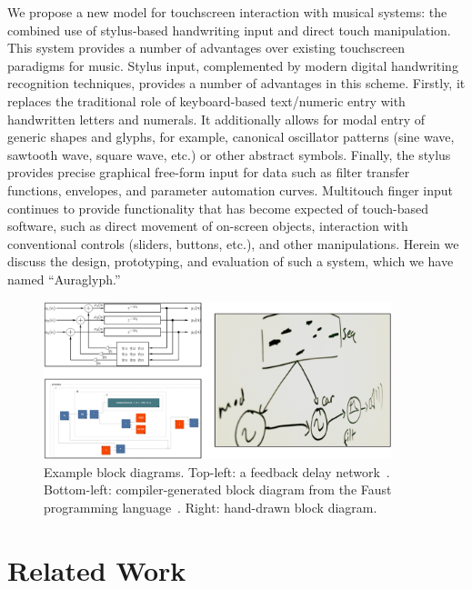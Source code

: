 \documentclass{nime-alternate}
\begin{document}
We propose a new model for touchscreen interaction with musical systems: the combined use of stylus-based handwriting input and direct touch manipulation. 
This system provides a number of advantages over existing touchscreen paradigms for music. 
Stylus input, complemented by modern digital handwriting recognition techniques, provides a number of advantages in this scheme. 
Firstly, it replaces the traditional role of keyboard-based text/numeric entry with handwritten letters and numerals.
It additionally allows for modal entry of generic shapes and glyphs, for example, canonical oscillator patterns (sine wave, sawtooth wave, square wave, etc.) or other abstract symbols.
Finally, the stylus provides precise graphical free-form input for data such as filter transfer functions, envelopes, and parameter automation curves. 
Multitouch finger input continues to provide functionality that has become expected of touch-based software, such as direct movement of on-screen objects, interaction with conventional controls (sliders, buttons, etc.), and other manipulations. 
Herein we discuss the design, prototyping, and evaluation of such a system, which we have named ``Auraglyph.''

\begin{figure}[h!]
	\centering
		\includegraphics[width=0.9\textwidth]{figures/block.png}
	\caption{Example block diagrams. Top-left: a feedback delay network\protect~\cite{smith2010pasp}. Bottom-left: compiler-generated block diagram from the Faust programming language\protect~\cite{faustOnline}. Right: hand-drawn block diagram.}
	\label{fig:blockDiagram}
\end{figure}

\section{Related Work}
\label{sec:RelatedWork}

\end{document}
